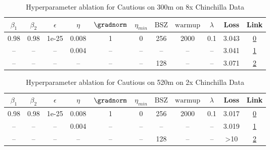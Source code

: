 \begin{table}[H]
\centering
\caption{Hyperparameter ablation for Cautious on 300m on 8x Chinchilla Data}
\label{tab:ablation_cautious_300m_on_8x_chinchilla_data}
\begin{tabular}{ccccccccccc}
\toprule
$\beta_1$ & $\beta_2$ & $\epsilon$ & $\eta$ & $\gradnorm$ & $\eta_{min}$ & $\mathrm{BSZ}$ & $\mathrm{warmup}$ & $\lambda$ & Loss & Link \\
\midrule
0.98 & 0.98 & 1e-25 & 0.008 & 1 & 0 & 256 & 2000 & 0.1 & 3.043 & \href{https://wandb.ai/stanford-mercury/optimizer-scaling/runs/sweep-300m-48B-cautious1c558clr0.008-wd0.1-minlr0-warmup2000-b10-cae294}{0} \\
\midrule
-- & -- & -- & 0.004 & -- & -- & -- & -- & -- & 3.041 & \href{https://wandb.ai/stanford-mercury/optimizer-scaling/runs/sweep-300m-48B-cautious3f9d23lr0.004-wd0.1-minlr0-warmup2000-b10-a68907}{1} \\
-- & -- & -- & -- & -- & -- & 128 & -- & -- & 3.071 & \href{https://wandb.ai/stanford-mercury/optimizer-scaling/runs/sweep-300m-48B-cautious41cea2lr0.008-wd0.1-minlr0-warmup2000-b10-d0662d}{2} \\
\bottomrule
\end{tabular}
\end{table}

\begin{table}[H]
\centering
\caption{Hyperparameter ablation for Cautious on 520m on 2x Chinchilla Data}
\label{tab:ablation_cautious_520m_on_2x_chinchilla_data}
\begin{tabular}{ccccccccccc}
\toprule
$\beta_1$ & $\beta_2$ & $\epsilon$ & $\eta$ & $\gradnorm$ & $\eta_{min}$ & $\mathrm{BSZ}$ & $\mathrm{warmup}$ & $\lambda$ & Loss & Link \\
\midrule
0.98 & 0.98 & 1e-25 & 0.008 & 1 & 0 & 256 & 2000 & 0.1 & 3.017 & \href{https://wandb.ai/stanford-mercury/optimizer-scaling/runs/sweep-520m-21B-cautiousc38916lr0.008-wd0.1-minlr0-warmup2000-b10-e8000b}{0} \\
\midrule
-- & -- & -- & 0.004 & -- & -- & -- & -- & -- & 3.019 & \href{https://wandb.ai/stanford-mercury/optimizer-scaling/runs/sweep-520m-21B-cautious1579b5lr0.004-wd0.1-minlr0-warmup2000-b10-ef172f}{1} \\
-- & -- & -- & -- & -- & -- & 128 & -- & -- & >10 & \href{https://wandb.ai/stanford-mercury/optimizer-scaling/runs/sweep-520m-21B-cautiousgd91085lr0.008-wd0.1-minlr0-warmup2000-b1-65a0d4}{2} \\
\bottomrule
\end{tabular}
\end{table}

